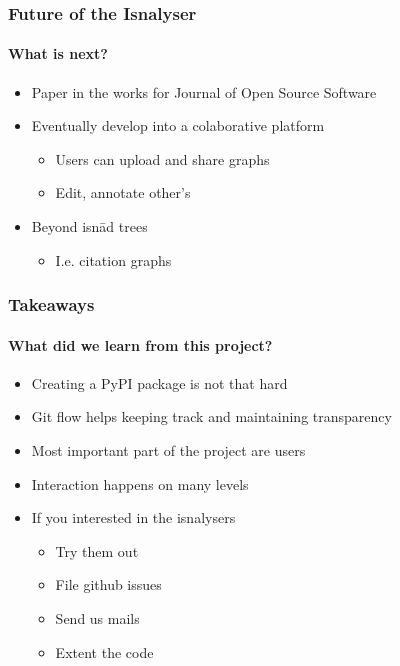 \documentclass[9pt]{beamer}
\begin{document}
\begin{frame}
\frametitle{Future of the Isnalyser}
\framesubtitle{What is next?}
\begin{itemize}
	\item Paper in the works for Journal of Open Source Software
	\item Eventually develop into a colaborative platform
	\begin{itemize}
		\item Users can upload and share graphs
		\item Edit, annotate other's
	\end{itemize}
	\item Beyond isnād trees
	\begin{itemize}
		\item I.e. citation graphs
	\end{itemize}
\end{itemize}
\end{frame}






\begin{frame}
\frametitle{Takeaways}
\framesubtitle{What did we learn from this project?}
\begin{itemize}%
	\item Creating a PyPI package is not that hard
	\item Git flow helps keeping track and maintaining transparency
	\item Most important part of the project are users
	\item Interaction happens on many levels
	\item If you interested in the isnalysers
	\begin{itemize}
		\item Try them out
		\item File github issues
		\item Send us mails
		\item Extent the code
	\end{itemize}
\end{itemize}
\end{frame} 
\end{document}
